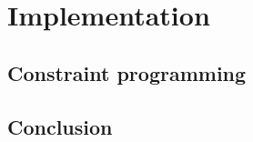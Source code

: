 \chapter{Implementation}
\label{cha:impl}
\label{impl:Intro}

\section{Constraint programming}
\label{CS:CP}


\section{Conclusion}
\label{impl:conclusion}

